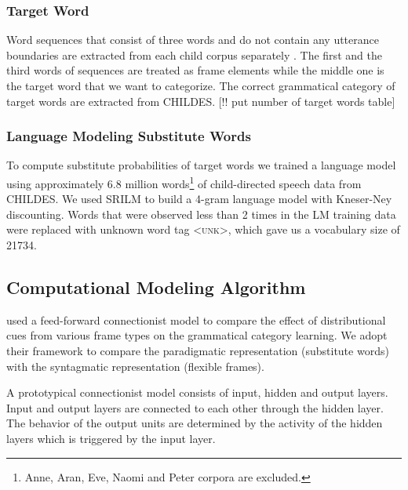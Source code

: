 \subsubsection{Target Word}
Word sequences that consist of three words and do not contain any utterance
boundaries are extracted from each child corpus separately
\citep*{Mintz200391}.  The first and the third words of sequences are treated
as frame elements while the middle one is the target word that we want to
categorize.  The correct grammatical category of target words are extracted
from CHILDES.  [!! put number of target words table] 

\subsubsection{Language Modeling Substitute Words}
\label{s:lm}
To compute substitute probabilities of target words we trained a language model
using approximately 6.8 million words\footnote{Anne, Aran, Eve, Naomi and Peter
corpora are excluded.} of child-directed speech data from CHILDES.  We used
SRILM \citep*{Stolcke2002} to build a 4-gram language model with Kneser-Ney
discounting.  Words that were observed less than 2 times in the LM training
data were replaced with unknown word tag \textsc{<unk>}, which gave us a
vocabulary size of 21734.



\subsection{Computational Modeling Algorithm}
\label{s:computational}
\cite{clair2010} used a feed-forward connectionist model to compare
the effect of distributional cues from various frame types on the
grammatical category learning.  We adopt their framework to compare
the paradigmatic representation (substitute words) with the
syntagmatic representation (flexible frames).

A prototypical connectionist model consists of input, hidden and
output layers.  Input and output layers are connected to each other
through the hidden layer.  The behavior of the output units are
determined by the activity of the hidden layers which is triggered by
the input layer.

